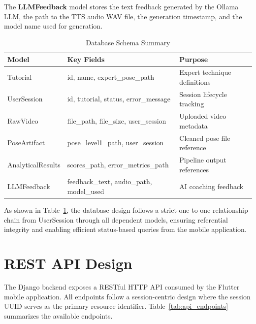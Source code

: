 \begin{sloppypar}
The \textbf{LLMFeedback} model stores the text feedback generated by the Ollama LLM, the path to the TTS audio WAV file, the generation timestamp, and the model name used for generation.

\begin{table}[H]
\centering
\caption{Database Schema Summary}
\label{tab:db_schema}
\begin{tabular}{|l|l|p{6cm}|}
\hline
\textbf{Model} & \textbf{Key Fields} & \textbf{Purpose} \\
\hline
Tutorial & id, name, expert\_pose\_path & Expert technique definitions \\
\hline
UserSession & id, tutorial, status, error\_message & Session lifecycle tracking \\
\hline
RawVideo & file\_path, file\_size, user\_session & Uploaded video metadata \\
\hline
PoseArtifact & pose\_level1\_path, user\_session & Cleaned pose file reference \\
\hline
AnalyticalResults & scores\_path, error\_metrics\_path & Pipeline output references \\
\hline
LLMFeedback & feedback\_text, audio\_path, model\_used & AI coaching feedback \\
\hline
\end{tabular}
\end{table}

As shown in Table~\ref{tab:db_schema}, the database design follows a strict one-to-one relationship chain from UserSession through all dependent models, ensuring referential integrity and enabling efficient status-based queries from the mobile application.


\section{REST API Design}

The Django backend exposes a RESTful HTTP API consumed by the Flutter mobile application. All endpoints follow a session-centric design where the session UUID serves as the primary resource identifier. Table~\ref{tab:api_endpoints} summarizes the available endpoints.


\end{sloppypar}
